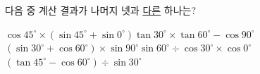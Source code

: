 다음 중 계산 결과가 나머지 넷과 \underline{다른} 하나는?
\begin{choicesv}{$\cos 45^\circ\times(\sin 45^\circ+\sin 0^\circ)$}{$\tan 30^\circ\times\tan 60^\circ-\cos 90^\circ$}{$(\sin 30^\circ+\cos 60^\circ)\times\sin 90^\circ$}{$\sin 60^\circ\div\cos 30^\circ\times\cos 0^\circ$}{$(\tan 45^\circ-\cos 60^\circ)\div\sin 30^\circ$}\end{choicesv}

